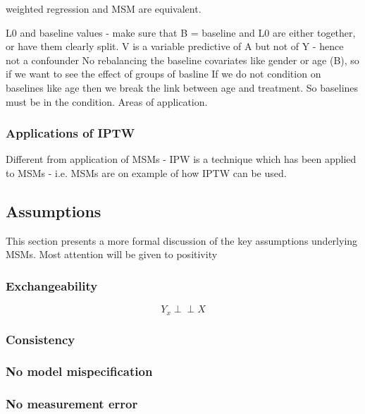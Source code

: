 \documentclass[11pt]{article}
\begin{document}
weighted regression and MSM are equivalent.

L0 and baseline values - make sure that B = baseline and L0 are either
together, or have them clearly split. V is a variable predictive of A
but not of Y - hence not a confounder No rebalancing the baseline
covariates like gender or age (B), so if we want to see the effect of
groups of basline If we do not condition on baselines like age then we
break the link between age and treatment. So baselines must be in the
condition. Areas of application.

\subsubsection{Applications of IPTW}\label{applications-of-iptw}

Different from application of MSMs - IPW is a technique which has been
applied to MSMs - i.e. MSMs are on example of how IPTW can be used.

    \subsection{Assumptions}\label{assumptions}

This section presents a more formal discussion of the key assumptions
underlying MSMs. Most attention will be given to positivity

\subsubsection{Exchangeability}\label{exchangeability}

\[Y_{x} \perp\!\!\!\perp X\]

\subsubsection{Consistency}\label{consistency}

\citet{Cole2009} \citet{Pearl2010}

\subsubsection{No model mispecification}\label{no-model-mispecification}

\subsubsection{No measurement error}\label{no-measurement-error}
\end{document}
